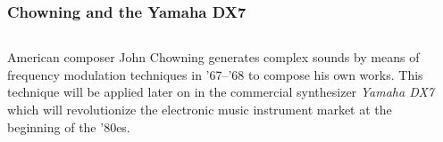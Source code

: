 \begin{frame}
    \frametitle{Chowning and the Yamaha DX7}
    
    \begin{columns}[T]
        \begin{column}{0.6\textwidth}
						American composer John Chowning generates complex sounds by means
						of frequency modulation techniques in '67--'68 to compose his own works.
						This technique will be applied later on in the commercial
						synthesizer \emph{Yamaha DX7} which will revolutionize the
						electronic music instrument market at the beginning of the '80es.
        \end{column}
        \begin{column}{0.4\textwidth}
            \begin{center}
            \end{center}
            \hspace{-4cm}
        \end{column}
    \end{columns}

\end{frame}

